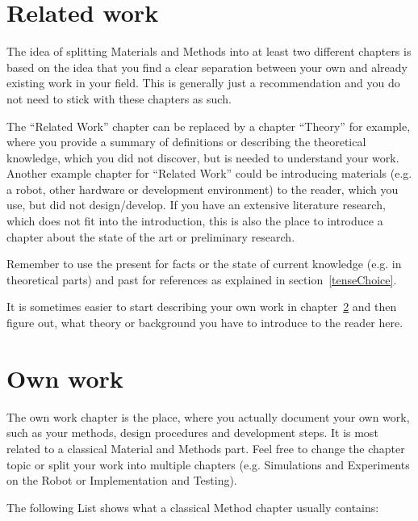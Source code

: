 \section{Related work}\label{relatedwork}

The idea of splitting Materials and Methods into at least two different chapters is based on the idea that you find a clear separation between your own and already existing work in your field.
This is generally just a recommendation and you do not need to stick with these chapters as such.

The ``Related Work'' chapter can be replaced by a chapter ``Theory'' for example, where you provide a summary of definitions or describing the theoretical knowledge, which you did not discover, but is needed to understand your work.
Another example chapter for ``Related Work'' could be introducing materials (e.g. a robot, other hardware or development environment) to the reader, which you use, but did not design/develop.
If you have an extensive literature research, which does not fit into the introduction, this is also the place to introduce a chapter about the state of the art or preliminary research.

Remember to use the present for facts or the state of current knowledge (e.g. in theoretical parts) and past for references as explained in section~\ref{tenseChoice}.

It is sometimes easier to start describing your own work in chapter~\ref{ownwork} and then figure out, what theory or background you have to introduce to the reader here.

\section{Own work}\label{ownwork} 

The own work chapter is the place, where you actually document your own work, such as your methods, design procedures and development steps.
It is most related to a classical Material and Methods part.
Feel free to change the chapter topic or split your work into multiple chapters (e.g. Simulations and Experiments on the Robot or Implementation and Testing).

The following List shows what a classical Method chapter usually contains:

